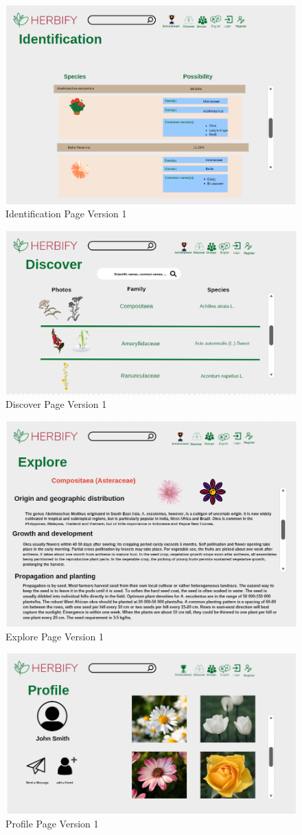 \documentclass[conference]{IEEEtran}
\begin{document}
\begin{figure}[H]
\centerline{\includegraphics[width=0.48 \textwidth]{images/identificaitonv1.png}}
\caption{Identification Page Version 1}
\label{fig:graph1}
\end{figure}


\begin{figure}[H]
\centerline{\includegraphics[width=0.48 \textwidth]{images/discoverv1.png}}
    \caption{Discover Page Version 1}
\label{fig:graph1}
\end{figure}



\begin{figure}[H]
\centerline{\includegraphics[width=0.48 \textwidth]{images/explorev1.png}}
\caption{Explore Page Version 1}
\label{fig:graph1}
\end{figure}


\begin{figure}[H]
\centerline{\includegraphics[width=0.48 \textwidth]{images/profilev1.png}}
\caption{Profile Page Version 1}
\label{fig:graph1}
\end{figure}
\end{document}
